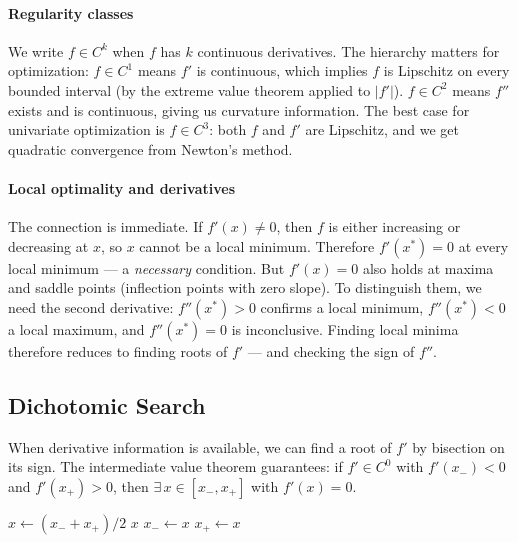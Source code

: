\paragraph{Regularity classes}

We write $f \in C^k$ when $f$ has $k$ continuous derivatives.
The hierarchy matters for optimization:
$f \in C^1$ means $f'$ is continuous, which implies $f$ is Lipschitz on every bounded interval (by the extreme value theorem applied to $|f'|$).
$f \in C^2$ means $f''$ exists and is continuous, giving us curvature information.
The best case for univariate optimization is $f \in C^3$: both $f$ and $f'$ are Lipschitz, and we get quadratic convergence from Newton's method.

\paragraph{Local optimality and derivatives}

The connection is immediate.
If $f'(x) \neq 0$, then $f$ is either increasing or decreasing at $x$, so $x$ cannot be a local minimum.
Therefore $f'(x^*) = 0$ at every local minimum --- a \textit{necessary} condition.
But $f'(x) = 0$ also holds at maxima and saddle points (inflection points with zero slope).
To distinguish them, we need the second derivative: $f''(x^*) > 0$ confirms a local minimum, $f''(x^*) < 0$ a local maximum, and $f''(x^*) = 0$ is inconclusive.
Finding local minima therefore reduces to finding roots of $f'$ --- and checking the sign of $f''$.


\subsection{Dichotomic Search}\label{ssec:dichotomic}

When derivative information is available, we can find a root of $f'$ by bisection on its sign.
The intermediate value theorem guarantees: if $f' \in C^0$ with $f'(x_-) < 0$ and $f'(x_+) > 0$, then $\exists\, x \in [x_-, x_+]$ with $f'(x) = 0$.

\begin{algorithm}
	\caption{Dichotomic Search (DS)}
	\begin{algorithmic}[1]
			\Repeat
				\State $x \gets (x_- + x_+) / 2$
				 \Return $x$ \EndIf
					\State $x_- \gets x$ 
				\Else
					\State $x_+ \gets x$ 
				\EndIf
		\EndProcedure
	\end{algorithmic}
\end{algorithm}

